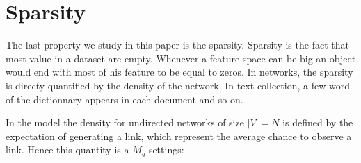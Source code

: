 \section{Sparsity}

The last property we study in this paper is the sparsity. Sparsity is the fact that most value in a dataset are empty. Whenever a feature space can be big an object would end with most of his feature to be equal to zeros. In networks, the sparsity is directy quantified by the density of the network. In text collection, a few word of the dictionnary appears in each document and so on.




In the model the density for undirected networks of size $|V|=N$ is defined by the expectation of generating a link, which represent the average chance to observe a link. Hence this quantity is a $M_g$ settings:


